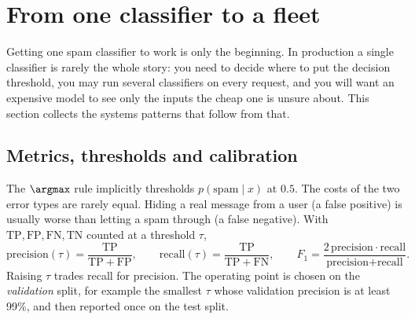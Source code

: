 \section{From one classifier to a fleet}\label{sec:classify:fleet}

Getting one spam classifier to work is only the beginning. In production a single classifier is
rarely the whole story: you need to decide where to put the decision threshold, you may
run several classifiers on every request, and you will want an expensive model to see
only the inputs the cheap one is unsure about. This section collects the systems
patterns that follow from that.

\subsection{Metrics, thresholds and calibration}

The $\argmax$ rule implicitly thresholds $p(\text{spam}\mid x)$ at $0.5$. The costs of
the two error types are rarely equal. Hiding a real message from a user (a false
positive) is usually worse than letting a spam through (a false negative). With
$\mathrm{TP},\mathrm{FP},\mathrm{FN},\mathrm{TN}$ counted at a threshold $\tau$,
\begin{equation}
\text{precision}(\tau) = \frac{\mathrm{TP}}{\mathrm{TP}+\mathrm{FP}},\qquad
\text{recall}(\tau) = \frac{\mathrm{TP}}{\mathrm{TP}+\mathrm{FN}},\qquad
F_1 = \frac{2\,\text{precision}\cdot\text{recall}}{\text{precision}+\text{recall}}.
\label{eq:classify:prf}
\end{equation}
Raising $\tau$ trades recall for precision. The operating point is chosen on the
\emph{validation} split, for example the smallest $\tau$ whose validation precision is
at least 99\%, and then reported once on the test split.

